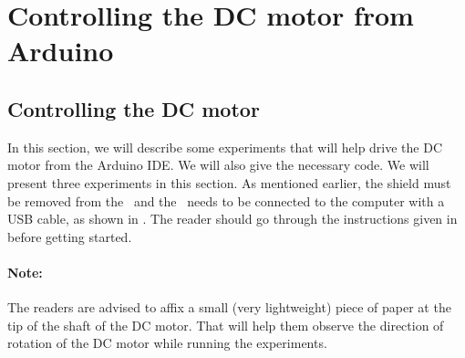 \section{Controlling the DC motor from Arduino}
\subsection{Controlling the DC motor}
\label{sec:dcm-ard}
In this section, we will describe some experiments that will help
drive the DC motor from the Arduino IDE.  We will also give the
necessary code.  We will present three experiments in this section. 
As mentioned earlier, the shield must be removed from 
the \arduino\ and the \arduino\ needs to be connected to the computer 
with a USB cable, as shown in . The reader should go through the
instructions given in  before getting started. 

\paragraph{Note:} The readers are advised to affix a small 
(very lightweight) piece of paper at the tip of the shaft of the DC motor. 
That will help them observe the direction of rotation 
of the DC motor while running the experiments. 

